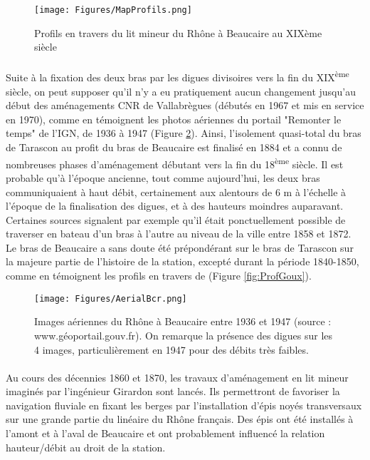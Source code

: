 \documentclass[11pt]{article}
\begin{document}
        \begin{figure}[h]
            \centering
            \texttt{[image: Figures/MapProfils.png]}
            \caption{Profils en travers du lit mineur du Rhône à Beaucaire au XIXème siècle}
            \label{fig:Profils19eme}
        \end{figure}
            
\FloatBarrier
        \paragraph{} Suite à la fixation des deux bras par les digues divisoires vers la fin du XIX\textsuperscript{ème} siècle, on peut supposer qu'il n'y a eu pratiquement aucun changement jusqu'au début des aménagements CNR de Vallabrègues (débutés en 1967 et mis en service en 1970), comme en témoignent les photos aériennes du portail "Remonter le temps" de l'IGN, de 1936 à 1947 (Figure \ref{fig:AerialBcr}). Ainsi, l'isolement quasi-total du bras de Tarascon au profit du bras de Beaucaire est finalisé en 1884 et a connu de nombreuses phases d'aménagement débutant vers la fin du 18\textsuperscript{ème} siècle. Il est probable qu'à l'époque ancienne, tout comme aujourd'hui, les deux bras communiquaient à haut débit, certainement aux alentours de 6 m à l'échelle à l'époque de la finalisation des digues, et à des hauteurs moindres auparavant. Certaines sources signalent par exemple qu'il était ponctuellement possible de traverser en bateau d'un bras à l'autre au niveau de la ville entre 1858 et 1872. Le bras de Beaucaire a sans doute été prépondérant sur le bras de Tarascon sur la majeure partie de l'histoire de la station, excepté durant la période 1840-1850, comme en témoignent les profils en travers de \citet{goux_modification_1851} (Figure \ref{fig:ProfGoux}).
    
        \begin{figure}[h]
            \centering
        	\texttt{[image: Figures/AerialBcr.png]}
            \caption{Images aériennes du Rhône à Beaucaire entre 1936 et 1947 (source : www.géoportail.gouv.fr). On remarque la présence des digues sur les 4 images, particulièrement en 1947 pour des débits très faibles.}
            \label{fig:AerialBcr}
        \end{figure}
    
		\paragraph{} Au cours des décennies 1860 et 1870, les travaux d'aménagement en lit mineur imaginés par l'ingénieur Girardon sont lancés. Ils permettront de favoriser la navigation fluviale en fixant les berges par l'installation d'épis noyés transversaux sur une grande partie du linéaire du Rhône français. Des épis ont été installés à l'amont et à l'aval de Beaucaire et ont probablement influencé la relation hauteur/débit au droit de la station.
    
\end{document}
